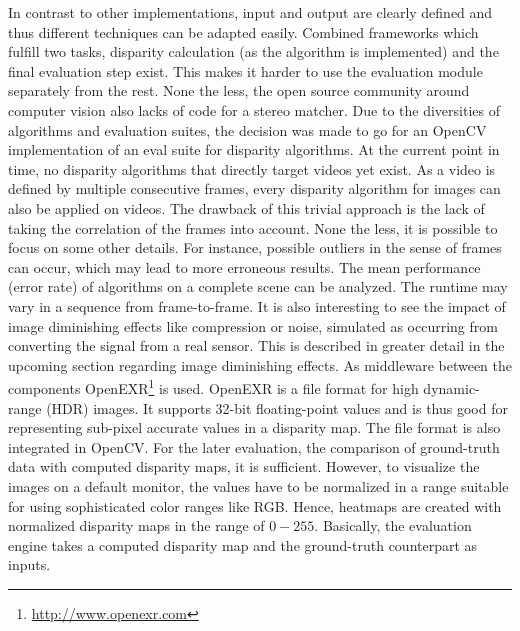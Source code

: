 \noindent In contrast to other implementations, input and output are clearly defined and thus different techniques can be adapted easily.
Combined frameworks which fulfill two tasks, disparity calculation (as the algorithm is implemented) and the final evaluation step exist.
This makes it harder to use the evaluation module separately from the rest.
None the less, the open source community around computer vision also lacks of code for a stereo matcher.
Due to the diversities of algorithms and evaluation suites, the decision was made to go for an OpenCV implementation of an eval suite for disparity algorithms.
\newline\newline\noindent At the current point in time, no disparity algorithms that directly target videos yet exist.
As a video is defined by multiple consecutive frames, every disparity algorithm for images can also be applied on videos.
The drawback of this trivial approach is the lack of taking the correlation of the frames into account.
None the less, it is possible to focus on some other details.
\newline\newline\noindent For instance, possible outliers in the sense of frames can occur, which may lead to more erroneous results.
The mean performance (error rate) of algorithms on a complete scene can be analyzed.
The runtime may vary in a sequence from frame-to-frame.
It is also interesting to see the impact of image diminishing effects like compression or noise, simulated as occurring from converting the signal from a real sensor.
This is described in greater detail in the upcoming section regarding image diminishing effects.
\newline\newline\noindent As middleware between the components OpenEXR\footnote{\url{http://www.openexr.com}} is used.
OpenEXR is a file format for high dynamic-range (HDR) images.
It supports 32-bit floating-point values and is thus good for representing sub-pixel accurate values in a disparity map.
The file format is also integrated in OpenCV.
For the later evaluation, the comparison of ground-truth data with computed disparity maps, it is sufficient.
However, to visualize the images on a default monitor, the values have to be normalized in a range suitable for using sophisticated color ranges like RGB.
Hence, heatmaps are created with normalized disparity maps in the range of $0-255$.
\newline\newline\noindent Basically, the evaluation engine takes a computed disparity map and the ground-truth counterpart as inputs.
